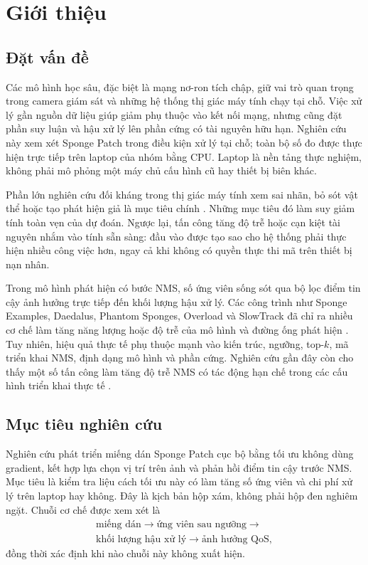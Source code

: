 \documentclass[a4paper,fleqn]{cas-dc}
\begin{document}
\section{Giới thiệu}

\subsection{Đặt vấn đề}

Các mô hình học sâu, đặc biệt là mạng nơ-ron tích chập, giữ vai trò quan trọng trong camera giám sát và những hệ thống thị giác máy tính chạy tại chỗ. Việc xử lý gần nguồn dữ liệu giúp giảm phụ thuộc vào kết nối mạng, nhưng cũng đặt phần suy luận và hậu xử lý lên phần cứng có tài nguyên hữu hạn. Nghiên cứu này xem xét Sponge Patch trong điều kiện xử lý tại chỗ; toàn bộ số đo được thực hiện trực tiếp trên laptop của nhóm bằng CPU. Laptop là nền tảng thực nghiệm, không phải mô phỏng một máy chủ cấu hình cũ hay thiết bị biên khác.

Phần lớn nghiên cứu đối kháng trong thị giác máy tính xem sai nhãn, bỏ sót vật thể hoặc tạo phát hiện giả là mục tiêu chính \cite{szegedy2013,goodfellow2014,madry2017}. Những mục tiêu đó làm suy giảm tính toàn vẹn của dự đoán. Ngược lại, tấn công tăng độ trễ hoặc cạn kiệt tài nguyên nhắm vào tính sẵn sàng: đầu vào được tạo sao cho hệ thống phải thực hiện nhiều công việc hơn, ngay cả khi không có quyền thực thi mã trên thiết bị nạn nhân.

Trong mô hình phát hiện có bước NMS, số ứng viên sống sót qua bộ lọc điểm tin cậy ảnh hưởng trực tiếp đến khối lượng hậu xử lý. Các công trình như Sponge Examples, Daedalus, Phantom Sponges, Overload và SlowTrack đã chỉ ra nhiều cơ chế làm tăng năng lượng hoặc độ trễ của mô hình và đường ống phát hiện \cite{shumailov2021,wang2021daedalus,shapira2023,chen2024overload,ma2024slowtrack}. Tuy nhiên, hiệu quả thực tế phụ thuộc mạnh vào kiến trúc, ngưỡng, top-$k$, mã triển khai NMS, định dạng mô hình và phần cứng. Nghiên cứu gần đây còn cho thấy một số tấn công làm tăng độ trễ NMS có tác động hạn chế trong các cấu hình triển khai thực tế \cite{monteuuis2025}.

\subsection{Mục tiêu nghiên cứu}

Nghiên cứu phát triển miếng dán Sponge Patch cục bộ bằng tối ưu không dùng gradient, kết hợp lựa chọn vị trí trên ảnh và phản hồi điểm tin cậy trước NMS. Mục tiêu là kiểm tra liệu cách tối ưu này có làm tăng số ứng viên và chi phí xử lý trên laptop hay không. Đây là kịch bản hộp xám, không phải hộp đen nghiêm ngặt. Chuỗi cơ chế được xem xét là
\[
\begin{gathered}
\text{miếng dán}\rightarrow\text{ứng viên sau ngưỡng}\rightarrow\\
\text{khối lượng hậu xử lý}\rightarrow\text{ảnh hưởng QoS},
\end{gathered}
\]
đồng thời xác định khi nào chuỗi này không xuất hiện.
\end{document}

